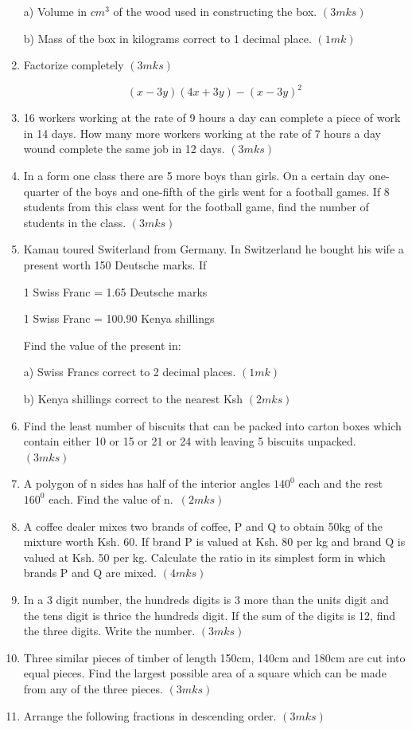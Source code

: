 \documentclass[
  a4paperpaper,
]{scrbook}
\begin{document}
\begin{tcolorbox}
\begin{enumerate}
  a) Volume in \(cm^3\) of the wood used in constructing the box.
  \((3mks)\)

  b) Mass of the box in kilograms correct to 1 decimal place. \((1mk)\)
\item
  Factorize completely \((3mks)\)

  \[(x-3y)(4x+3y)-(x-3y)^2\]
\item
  16 workers working at the rate of 9 hours a day can complete a piece
  of work in 14 days. How many more workers working at the rate of 7
  hours a day wound complete the same job in 12 days. \((3mks)\)
\item
  In a form one class there are 5 more boys than girls. On a certain day
  one-quarter of the boys and one-fifth of the girls went for a football
  games. If 8 students from this class went for the football game, find
  the number of students in the class. \((3mks)\)
\item
  Kamau toured Switerland from Germany. In Switzerland he bought his
  wife a present worth 150 Deutsche marks. If

  1 Swiss Franc = 1.65 Deutsche marks

  1 Swiss Franc = 100.90 Kenya shillings

  Find the value of the present in:

  a) Swiss Francs correct to 2 decimal places. \((1mk)\)

  b) Kenya shillings correct to the nearest Ksh \((2mks)\)
\item
  Find the least number of biscuits that can be packed into carton boxes
  which contain either 10 or 15 or 21 or 24 with leaving 5 biscuits
  unpacked. \((3mks)\)
\item
  A polygon of n sides has half of the interior angles \(140^0\) each
  and the rest \(160^0\) each. Find the value of n.~\((2mks)\)
\item
  A coffee dealer mixes two brands of coffee, P and Q to obtain 50kg of
  the mixture worth Ksh. 60. If brand P is valued at Ksh. 80 per kg and
  brand Q is valued at Ksh. 50 per kg. Calculate the ratio in its
  simplest form in which brands P and Q are mixed. \((4mks)\)
\item
  In a 3 digit number, the hundreds digits is 3 more than the units
  digit and the tens digit is thrice the hundreds digit. If the sum of
  the digits is 12, find the three digits. Write the number. \((3mks)\)
\item
  Three similar pieces of timber of length 150cm, 140cm and 180cm are
  cut into equal pieces. Find the largest possible area of a square
  which can be made from any of the three pieces. \((3mks)\)
\item
  Arrange the following fractions in descending order. \((3mks)\)
\end{enumerate}


\end{tcolorbox}
\end{document}
